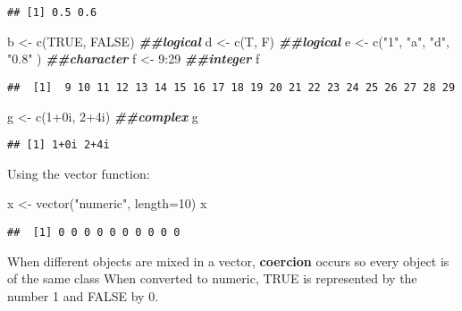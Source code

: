 \documentclass[
]{article}
\newenvironment{Shaded}{\begin{snugshade}}{\end{snugshade}}
\newcommand{\AttributeTok}[1]{\textcolor[rgb]{0.77,0.63,0.00}{#1}}
\newcommand{\ConstantTok}[1]{\textcolor[rgb]{0.00,0.00,0.00}{#1}}
\newcommand{\DecValTok}[1]{\textcolor[rgb]{0.00,0.00,0.81}{#1}}
\newcommand{\DocumentationTok}[1]{\textcolor[rgb]{0.56,0.35,0.01}{\textbf{\textit{#1}}}}
\newcommand{\FunctionTok}[1]{\textcolor[rgb]{0.00,0.00,0.00}{#1}}
\newcommand{\NormalTok}[1]{#1}
\newcommand{\OtherTok}[1]{\textcolor[rgb]{0.56,0.35,0.01}{#1}}
\newcommand{\SpecialCharTok}[1]{\textcolor[rgb]{0.00,0.00,0.00}{#1}}
\newcommand{\StringTok}[1]{\textcolor[rgb]{0.31,0.60,0.02}{#1}}
\begin{document}
\begin{verbatim}
## [1] 0.5 0.6
\end{verbatim}

\begin{Shaded}
\begin{Highlighting}[]
\NormalTok{b }\OtherTok{\textless{}{-}} \FunctionTok{c}\NormalTok{(}\ConstantTok{TRUE}\NormalTok{, }\ConstantTok{FALSE}\NormalTok{) }\DocumentationTok{\#\#logical}
\NormalTok{d }\OtherTok{\textless{}{-}} \FunctionTok{c}\NormalTok{(T, F)   }\DocumentationTok{\#\#logical}
\NormalTok{e }\OtherTok{\textless{}{-}} \FunctionTok{c}\NormalTok{(}\StringTok{"1"}\NormalTok{, }\StringTok{"a"}\NormalTok{, }\StringTok{"d"}\NormalTok{, }\StringTok{"0.8"}\NormalTok{ ) }\DocumentationTok{\#\#character}
\NormalTok{f }\OtherTok{\textless{}{-}} \DecValTok{9}\SpecialCharTok{:}\DecValTok{29} \DocumentationTok{\#\#integer}
\NormalTok{f}
\end{Highlighting}
\end{Shaded}

\begin{verbatim}
##  [1]  9 10 11 12 13 14 15 16 17 18 19 20 21 22 23 24 25 26 27 28 29
\end{verbatim}

\begin{Shaded}
\begin{Highlighting}[]
\NormalTok{g }\OtherTok{\textless{}{-}} \FunctionTok{c}\NormalTok{(}\DecValTok{1}\SpecialCharTok{+}\NormalTok{0i, }\DecValTok{2}\SpecialCharTok{+}\NormalTok{4i) }\DocumentationTok{\#\#complex}
\NormalTok{g}
\end{Highlighting}
\end{Shaded}

\begin{verbatim}
## [1] 1+0i 2+4i
\end{verbatim}

Using the vector function:

\begin{Shaded}
\begin{Highlighting}[]
\NormalTok{x }\OtherTok{\textless{}{-}} \FunctionTok{vector}\NormalTok{(}\StringTok{"numeric"}\NormalTok{, }\AttributeTok{length=}\DecValTok{10}\NormalTok{)}
\NormalTok{x}
\end{Highlighting}
\end{Shaded}

\begin{verbatim}
##  [1] 0 0 0 0 0 0 0 0 0 0
\end{verbatim}

When different objects are mixed in a vector, \textbf{coercion} occurs
so every object is of the same class When converted to numeric, TRUE is
represented by the number 1 and FALSE by 0.
\end{document}
